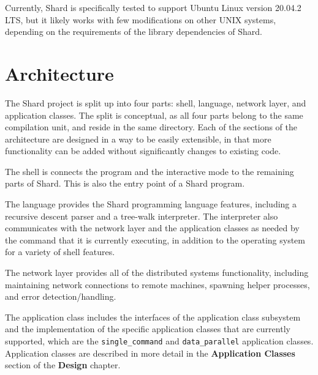 \documentclass[oneside]{report}
\begin{document}
Currently, Shard is specifically tested to support Ubuntu Linux version 20.04.2 LTS, but it likely works with few modifications on other UNIX systems, depending on the requirements of the library dependencies of Shard.

\section{Architecture}


The Shard project is split up into four parts: shell, language, network layer, and application classes. The split is conceptual, as all four parts belong to the same compilation unit, and reside in the same directory.
Each of the sections of the architecture are designed in a way to be easily extensible, in that more functionality can be added without significantly changes to existing code.

The shell is connects the program and the interactive mode to the remaining parts of Shard. This is also the entry point of a Shard program.

The language provides the Shard programming language features, including a recursive descent parser and a tree-walk interpreter. The interpreter also communicates with the network layer and the application classes as needed by the command that it is currently executing, in addition to the operating system for a variety of shell features.

The network layer provides all of the distributed systems functionality, including maintaining network connections to remote machines, spawning helper processes, and error detection/handling.

\begin{sloppypar}
  The application class includes the interfaces of the application class subsystem and the implementation of the specific application classes that are currently supported, which are the \texttt{single\_command} and \texttt{data\_parallel} application classes. Application classes are described in more detail in the \textbf{Application Classes} section of the \textbf{Design} chapter.
\end{sloppypar}
\end{document}
